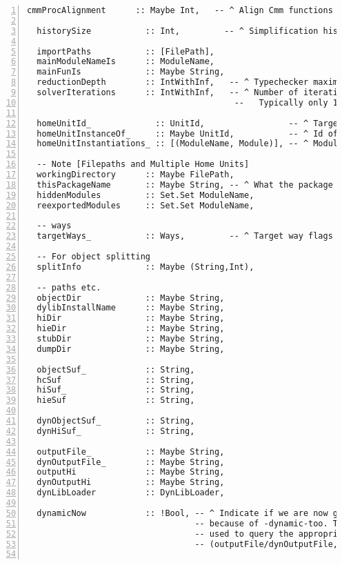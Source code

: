 \documentclass[en]{pracamgr}
\begin{document}
\begin{lstlisting}[numbers=left,stepnumber=1]
  cmmProcAlignment      :: Maybe Int,   -- ^ Align Cmm functions at this boundary or use default.

  historySize           :: Int,         -- ^ Simplification history size

  importPaths           :: [FilePath],
  mainModuleNameIs      :: ModuleName,
  mainFunIs             :: Maybe String,
  reductionDepth        :: IntWithInf,   -- ^ Typechecker maximum stack depth
  solverIterations      :: IntWithInf,   -- ^ Number of iterations in the constraints solver
                                          --   Typically only 1 is needed

  homeUnitId_             :: UnitId,                 -- ^ Target home unit-id
  homeUnitInstanceOf_     :: Maybe UnitId,           -- ^ Id of the unit to instantiate
  homeUnitInstantiations_ :: [(ModuleName, Module)], -- ^ Module instantiations

  -- Note [Filepaths and Multiple Home Units]
  workingDirectory      :: Maybe FilePath,
  thisPackageName       :: Maybe String, -- ^ What the package is called, use with multiple home units
  hiddenModules         :: Set.Set ModuleName,
  reexportedModules     :: Set.Set ModuleName,

  -- ways
  targetWays_           :: Ways,         -- ^ Target way flags from the command line

  -- For object splitting
  splitInfo             :: Maybe (String,Int),

  -- paths etc.
  objectDir             :: Maybe String,
  dylibInstallName      :: Maybe String,
  hiDir                 :: Maybe String,
  hieDir                :: Maybe String,
  stubDir               :: Maybe String,
  dumpDir               :: Maybe String,

  objectSuf_            :: String,
  hcSuf                 :: String,
  hiSuf_                :: String,
  hieSuf                :: String,

  dynObjectSuf_         :: String,
  dynHiSuf_             :: String,

  outputFile_           :: Maybe String,
  dynOutputFile_        :: Maybe String,
  outputHi              :: Maybe String,
  dynOutputHi           :: Maybe String,
  dynLibLoader          :: DynLibLoader,

  dynamicNow            :: !Bool, -- ^ Indicate if we are now generating dynamic output
                                  -- because of -dynamic-too. This predicate is
                                  -- used to query the appropriate fields
                                  -- (outputFile/dynOutputFile, ways, etc.)


\end{lstlisting}
\end{document}
